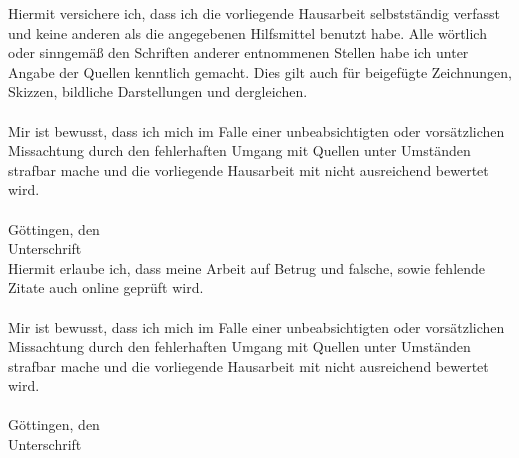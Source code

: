 \documentclass{Vorlage}
\begin{document}

Hiermit versichere ich, dass ich die vorliegende Hausarbeit selbstständig verfasst und keine anderen als die angegebenen
Hilfsmittel benutzt habe. Alle wörtlich oder sinngemäß den Schriften anderer entnommenen Stellen
habe ich unter Angabe der Quellen kenntlich gemacht. Dies gilt auch für beigefügte Zeichnungen, Skizzen, bildliche
Darstellungen und dergleichen.\\
\\
Mir ist bewusst, dass ich mich im Falle einer unbeabsichtigten oder vorsätzlichen Missachtung durch den fehlerhaften
Umgang mit Quellen unter Umständen strafbar mache und die vorliegende Hausarbeit mit nicht ausreichend
bewertet wird.
\\
\\Göttingen, den
\\Unterschrift
\vspace*{4cm}
\\
Hiermit erlaube ich, dass meine Arbeit auf Betrug und falsche, sowie fehlende Zitate auch online geprüft wird.\\
\\
Mir ist bewusst, dass ich mich im Falle einer unbeabsichtigten oder vorsätzlichen Missachtung durch den fehlerhaften
Umgang mit Quellen unter Umständen strafbar mache und die vorliegende Hausarbeit mit nicht ausreichend
bewertet wird.
\\
\\Göttingen, den
\\Unterschrift
\clearpage
\end{document}
